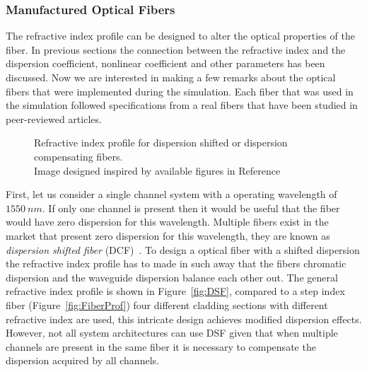 \subsubsection{Manufactured Optical Fibers}\label{sec:ManOpF}

The refractive index profile can be designed to alter the optical properties of the fiber. In previous sections the connection between the refractive index and the dispersion coefficient, nonlinear coefficient and other parameters has been discussed. Now we are interested in making a few remarks about the optical fibers that were implemented during the simulation. Each fiber that was used in the simulation followed specifications from a real fibers that have been studied in peer-reviewed articles.
\begin{figure}[h]
  \centering
  \qquad
  \caption{Refractive index profile for dispersion shifted or dispersion compensating fibers. \\ {\scriptsize Image designed inspired by available figures in Reference~\cite{kato2000dispersion,aikawa2005dispersion}}}
  \label{fig:FiberIndex}
\end{figure}

First, let us consider a single channel system with a operating wavelength of $1550~nm$. If only one channel is present then it would be useful that the fiber would have zero dispersion for this wavelength. Multiple fibers exist in the market that present zero dispersion for this wavelength, they are known as  \textit{dispersion shifted fiber} (DCF)~\cite{kato2000dispersion,kim1994measurement}. To design a optical fiber with a shifted dispersion the refractive index profile has to made in such away that the fibers chromatic dispersion and the waveguide dispersion balance each other out. The general refractive index profile is shown in Figure~\ref{fig:DSF}, compared to a step index fiber (Figure~\ref{fig:FiberProf}) four different cladding sections with different refractive index are used, this intricate design achieves modified dispersion effects. However, not all system architectures can use DSF given that when multiple channels are present in the same fiber it is necessary to compensate the dispersion acquired by all channels.


